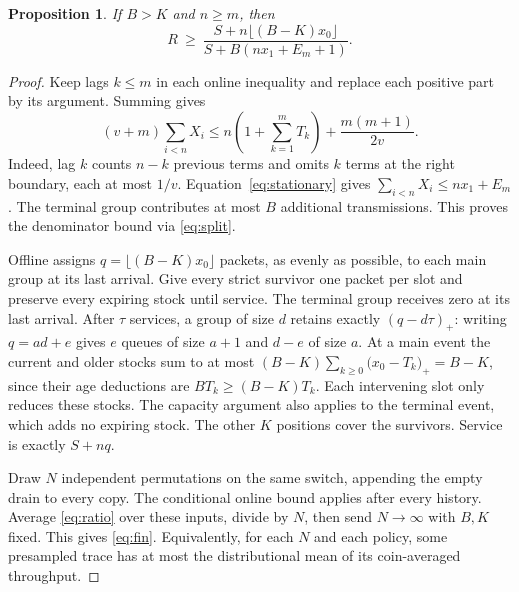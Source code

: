 \documentclass[11pt,letterpaper]{article}
\newtheorem{proposition}{Proposition}
\newcommand{\pos}[1]{\bigl(#1\bigr)_{+}}
\begin{document}
\begin{proposition}\label{prop:fin}
If $B>K$ and $n\ge m$, then
\begin{equation}
 R\ \ge\ \frac{S+n\lfloor(B-K)x_0\rfloor}{S+B(nx_1+E_m+1)}.\label{eq:fin}
\end{equation}
\end{proposition}
\begin{proof}
Keep lags $k\le m$ in each online inequality and replace each positive part by its argument. Summing gives
\[(v+m)\sum_{i<n}X_i\le n\!\left(1+\sum_{k=1}^m T_k\right)+\frac{m(m+1)}{2v} .\]
Indeed, lag $k$ counts $n-k$ previous terms and omits $k$ terms at the right boundary, each at most $1/v$. Equation~\eqref{eq:stationary} gives $\sum_{i<n} X_i\le nx_1+E_m$. The terminal group contributes at most $B$ additional transmissions. This proves the denominator bound via \eqref{eq:split}.

Offline assigns $q=\lfloor(B-K)x_0\rfloor$ packets, as evenly as possible, to each main group at its last arrival. Give every strict survivor one packet per slot and preserve every expiring stock until service. The terminal group receives zero at its last arrival. After $\tau$ services, a group of size $d$ retains exactly $(q-d\tau)_+$: writing $q=ad+e$ gives $e$ queues of size $a+1$ and $d-e$ of size $a$. At a main event the current and older stocks sum to at most $(B-K)\sum_{k\ge0}\pos{x_0-T_k}=B-K$, since their age deductions are $BT_k\ge(B-K)T_k$. Each intervening slot only reduces these stocks. The capacity argument also applies to the terminal event, which adds no expiring stock. The other $K$ positions cover the survivors. Service is exactly $S+nq$.

Draw $N$ independent permutations on the same switch, appending the empty drain to every copy. The conditional online bound applies after every history. Average \eqref{eq:ratio} over these inputs, divide by $N$, then send $N\to\infty$ with $B,K$ fixed. This gives \eqref{eq:fin}. Equivalently, for each $N$ and each policy, some presampled trace has at most the distributional mean of its coin-averaged throughput.
\end{proof}

\newpage
\end{document}

